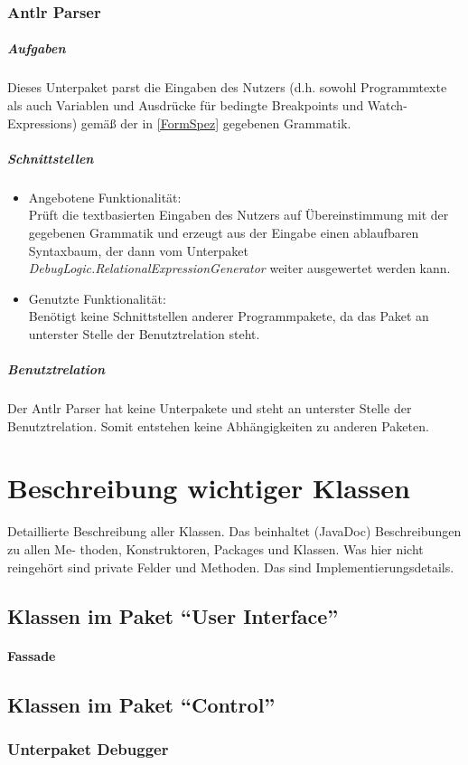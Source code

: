 ﻿\documentclass[parskip=full]{scrartcl}
\begin{document}
\subsubsection{Antlr Parser}
\subparagraph{Aufgaben}
Dieses Unterpaket parst die Eingaben des Nutzers (d.h. sowohl Programmtexte als auch Variablen und Ausdrücke für bedingte Breakpoints und Watch-Expressions) gemäß der in \ref{FormSpez} gegebenen Grammatik.

\subparagraph{Schnittstellen}
\begin{itemize}
\item Angebotene Funktionalität:\\
Prüft die textbasierten Eingaben des Nutzers auf Übereinstimmung mit der gegebenen Grammatik und erzeugt aus der Eingabe einen ablaufbaren Syntaxbaum, der dann vom Unterpaket \textit{DebugLogic.RelationalExpressionGenerator} weiter ausgewertet werden kann.
\item Genutzte Funktionalität:\\
Benötigt keine Schnittstellen anderer Programmpakete, da das Paket an unterster Stelle der Benutztrelation steht.
\end{itemize}
\subparagraph{Benutztrelation}
Der Antlr Parser hat keine Unterpakete und steht an unterster Stelle der Benutztrelation. Somit entstehen keine Abhängigkeiten zu anderen Paketen.

\section{Beschreibung wichtiger Klassen}\label{Klassen}
Detaillierte Beschreibung aller Klassen. Das beinhaltet (JavaDoc) Beschreibungen zu allen Me-
thoden, Konstruktoren, Packages und Klassen. Was hier nicht reingehört sind private Felder
und Methoden. Das sind Implementierungsdetails.

\subsection{Klassen im Paket \enquote{User Interface}}
\paragraph{Fassade}

\subsection{Klassen im Paket \enquote{Control}}

\subsubsection{Unterpaket Debugger}
\end{document}
